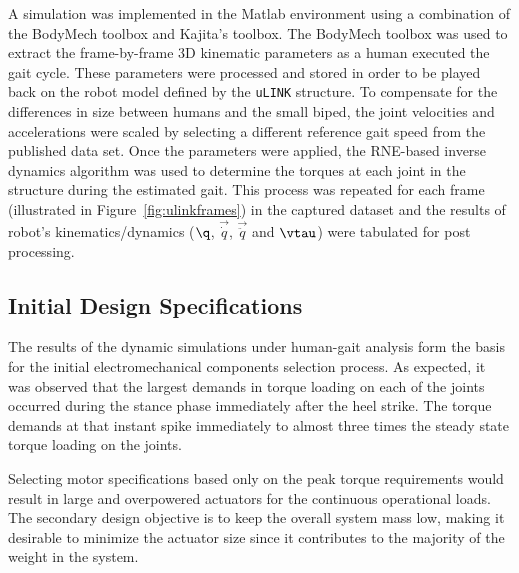 A simulation was implemented in the Matlab environment using a combination of the BodyMech toolbox and Kajita's toolbox. The BodyMech toolbox was used to extract the frame-by-frame 3D kinematic parameters as a human executed the gait cycle. These parameters were processed and stored in order to be played back on the robot model defined by the \texttt{uLINK} structure. To compensate for the differences in size between humans and the small biped, the joint velocities and accelerations were scaled by selecting a different reference gait speed from the published data set. Once the parameters were applied, the RNE-based inverse dynamics algorithm was used to determine the torques at each joint in the structure during the estimated gait. This process was repeated for each frame (illustrated in Figure~\ref{fig:ulinkframes}) in the captured dataset and the results of robot's kinematics/dynamics ($\q$, $\vec{\dot{q}}$, $\vec{\ddot{q}}$ and $\vtau$) were tabulated for post processing. 


\subsection{Initial Design Specifications} %
\label{sec:initial_design_requirements}
The results of the dynamic simulations under human-gait analysis form the basis for the initial electromechanical components selection process. As expected, it was observed that the largest demands in torque loading on each of the joints occurred during the stance phase immediately after the heel strike. The torque demands at that instant spike immediately to almost three times the steady state torque loading on the joints. 


Selecting motor specifications based only on the peak torque requirements would result in large and overpowered actuators for the continuous operational loads. The secondary design objective is to keep the overall system mass low, making it desirable to minimize the actuator size since it contributes to the majority of the weight in the system. 

